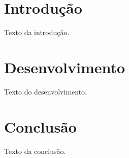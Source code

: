 \documentclass[12pt,openright,twoside,a4paper,english,brazil]{abntex2}
\begin{document}
\pretextual
\imprimircapa
\imprimirfolhaderosto

\textual
\chapter{Introdução}
Texto da introdução.

\chapter{Desenvolvimento}
Texto do desenvolvimento.

\chapter{Conclusão}
Texto da conclusão.


\end{document}
